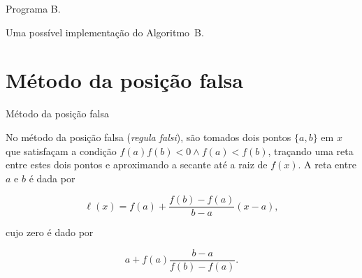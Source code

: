 \begin{frame}[fragile]{\sectiontitle}{Programa B.} 

Uma possível implementação do Algoritmo~B.



\end{frame}


\def\sectiontitle{Método da posição falsa}
\section{\sectiontitle}

\begin{frame}{\sectiontitle}

No método da posição falsa ({\it regula falsi\/}), 
são tomados dois pontos $\{a,b\}$ em $x$ que satisfaçam 
a condição $f(a)f(b)<0 \land f(a)<f(b)$, traçando 
uma reta entre estes dois pontos e aproximando a 
secante até a raiz de $f(x)$. A reta entre $a$ 
e $b$ é dada por

\begin{equation}
	\ell(x) = f(a) + \frac{f(b)-f(a)}{b-a}(x-a),
\end{equation}

\noindent cujo zero é dado por

\begin{equation}
	a + f(a)\frac{b-a}{f(b)-f(a)}.
\end{equation}

\end{frame}

